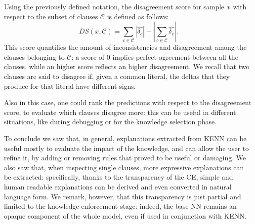 \begin{definition}
	Using the previously defined notation, the disagreement score for sample $x$ with respect to the subset of clauses $\mathcal{C}$ is defined as follows:
	\begin{equation}
DS(x, \mathcal{C}) = \sum_{c\in\mathcal{C}}\left|\hat{\delta_c}\right| - \left|\sum_{c\in\mathcal{C}}\hat{\delta_c} \right|.
	\end{equation}
This score quantifies the amount of inconsistencies and disagreement among the clauses belonging to $\mathcal{C}$: a score of $0$ implies perfect agreement between all the clauses, while an higher score reflects an higher disagreement. We recall that two clauses are said to disagree if, given a common literal, the deltas that they produce for that literal have different signs.
\end{definition}

Also in this case, one could rank the predictions with respect to the disagreement score, to evaluate which clauses disagree more: this can be useful in different situations, like during debugging or for the knowledge selection phase.

To conclude we saw that, in general, explanations extracted from KENN can be useful mostly to evaluate the impact of the knowledge, and can allow the user to refine it, by adding or removing rules that proved to be useful or damaging. We also saw that, when inspecting single clauses, more expressive explanations can be extracted: specifically, thanks to the transparency of the CE, simple and human readable explanations can be derived and even converted in natural language form. We remark, however, that this transparency is just partial and limited to the knowledge enforcement stage: indeed, the base NN remains an opaque component of the whole model, even if used in conjunction with KENN.
 


